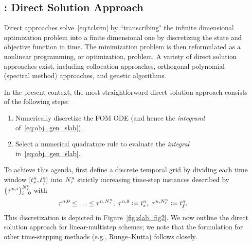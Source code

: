 \subsection{\spatialAcronym: Direct Solution Approach}\label{sec:direct} 
Direct approaches solve~\eqref{eq:tclsrm} by
``transcribing" the infinite dimensional optimization problem into a finite
dimensional one by discretizing the state and objective function in time.
The minimization problem is then reformulated as a nonlinear programming, or
optimization, problem. A variety of direct solution approaches exist, 
including collocation approaches, orthogonal polynomial (spectral  method) 
approaches, and genetic algorithms.  

In the present context, the most straightforward direct solution approach consists of the 
following steps:
\begin{enumerate}
\item Numerically discretize the FOM ODE (and hence the \textit{integrand} of~\eqref{eq:obj_gen_slab}).
\item Select a numerical quadrature rule to evaluate the \textit{integral}
in~\eqref{eq:obj_gen_slab}.
\end{enumerate}
To achieve this agenda, first define a discrete temporal grid 
by dividing each time window $[t_s^{n},t_f^{n}]$ into
$N_{\tau}^{n}$ strictly increasing time-step instances described by
$\{\tau^{n,i}\}_{i=0}^{N_{\tau}^{n}}$ with  
\begin{align}
&\tau^{n,0} \le \ldots \le \tau^{n,N_{\tau}^{n}} , \label{eq:timegrid1} \;
\tau^{n,0} \vcentcolon= t_s^{n},\;
\tau^{n,N_{\tau}^{n}} \vcentcolon= t_f^{n} . 
\end{align}
This discretization is depicted in Figure~\ref{fig:slab_fig2}.
We now outline the direct solution approach for linear-multistep schemes; we note that the formulation for
other time-stepping methods (e.g., Runge--Kutta) follows closely. 
